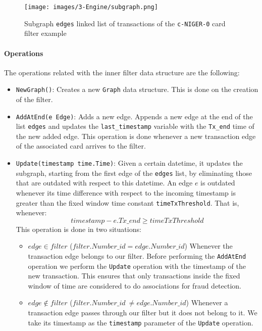 \begin{figure}[H]
    \centering
    \texttt{[image: images/3-Engine/subgraph.png]}
    \caption{Subgraph \texttt{edges} linked list of transactions of the \texttt{c-NIGER-0} card filter example}
    \label{img:pipeline-subgraph}
\end{figure}

\paragraph{Operations}
The operations related with the inner filter data structure are the following:

\begin{itemize}
    \item \texttt{NewGraph()}: Creates a new \texttt{Graph} data structure. This is done on the creation of the filter.
    
    \item \texttt{AddAtEnd(e Edge)}: Adds a new edge. Appends a new edge at the end of the list \texttt{edges} and updates the \texttt{last\_timestamp} variable with the \texttt{Tx\_end} time of the new added edge. This operation is done whenever a new transaction edge of the associated card arrives to the filter.
    
    \item \texttt{Update(timestamp time.Time)}: Given a certain datetime, it updates the subgraph, starting from the first edge of the \texttt{edges} list, by eliminating those that are outdated with respect to this datetime. An edge $e$ is outdated  whenever its time difference with respect to the incoming timestamp is greater than the fixed window time constant \texttt{timeTxThreshold}. That is, whenever: $$timestamp - e.Tx\_end \geq timeTxThreshold$$
    This operation is done in two situations:
    \begin{itemize}
        \item $edge \in filter$ ($filter.Number\_id = edge.Number\_id$) Whenever the transaction edge belongs to our filter. Before performing the \texttt{AddAtEnd} operation we perform the \texttt{Update} operation with the timestamp of the new transaction. This ensures that only transactions inside the fixed window of time are considered to do associations for fraud detection. 
        \item $edge \notin filter$ ($filter.Number\_id\ \neq edge.Number\_id$) Whenever a transaction edge passes through our filter but it does not belong to it. We take its timestamp as the \texttt{timestamp} parameter of the \texttt{Update} operation.
    \end{itemize}
    

\end{itemize}
